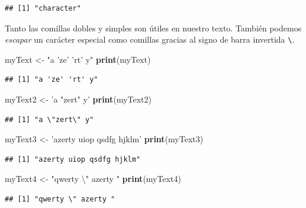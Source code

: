 \documentclass[
]{book}
\newenvironment{Shaded}{\begin{snugshade}}{\end{snugshade}}
\newcommand{\CharTok}[1]{\textcolor[rgb]{0.31,0.60,0.02}{#1}}
\newcommand{\KeywordTok}[1]{\textcolor[rgb]{0.13,0.29,0.53}{\textbf{#1}}}
\newcommand{\NormalTok}[1]{#1}
\newcommand{\StringTok}[1]{\textcolor[rgb]{0.31,0.60,0.02}{#1}}
\begin{document}
\begin{verbatim}
## [1] "character"
\end{verbatim}

Tanto las comillas dobles y simples son útiles en nuestro texto. También podemos \emph{escapar} un carácter especial como comillas gracias al signo de barra invertida \texttt{\textbackslash{}}.

\begin{Shaded}
\begin{Highlighting}[]
\NormalTok{myText <-}\StringTok{ "a 'ze' 'rt' y"}
\KeywordTok{print}\NormalTok{(myText)}
\end{Highlighting}
\end{Shaded}

\begin{verbatim}
## [1] "a 'ze' 'rt' y"
\end{verbatim}

\begin{Shaded}
\begin{Highlighting}[]
\NormalTok{myText2 <-}\StringTok{ 'a "zert" y'}
\KeywordTok{print}\NormalTok{(myText2)}
\end{Highlighting}
\end{Shaded}

\begin{verbatim}
## [1] "a \"zert\" y"
\end{verbatim}

\begin{Shaded}
\begin{Highlighting}[]
\NormalTok{myText3 <-}\StringTok{ 'azerty uiop qsdfg hjklm'}
\KeywordTok{print}\NormalTok{(myText3)}
\end{Highlighting}
\end{Shaded}

\begin{verbatim}
## [1] "azerty uiop qsdfg hjklm"
\end{verbatim}

\begin{Shaded}
\begin{Highlighting}[]
\NormalTok{myText4 <-}\StringTok{ "qwerty }\CharTok{\textbackslash{}"}\StringTok{ azerty "}
\KeywordTok{print}\NormalTok{(myText4)}
\end{Highlighting}
\end{Shaded}

\begin{verbatim}
## [1] "qwerty \" azerty "
\end{verbatim}
\end{document}
